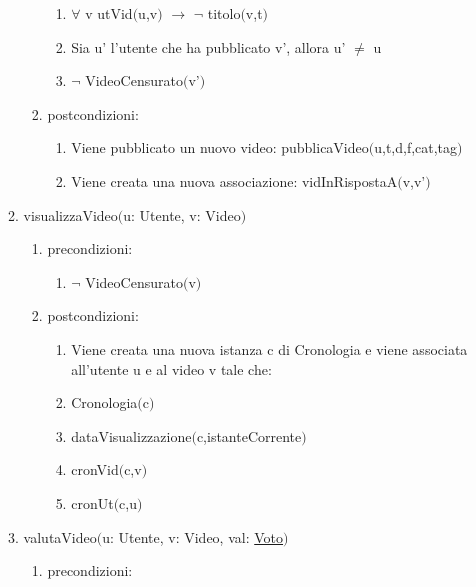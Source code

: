 \documentclass{article}
\begin{document}
\begin{enumerate}
\begin{enumerate}
\begin{enumerate}
            \begin{enumerate}
                \item $\forall$ v utVid$($u,v$)$ $\rightarrow$ $\neg$ titolo$($v,t$)$
                \item Sia u' l'utente che ha pubblicato v', allora u' $\neq$ u
                \item $\neg$ VideoCensurato$($v'$)$
            \end{enumerate}
            \item postcondizioni:
            \begin{enumerate}
                \item Viene pubblicato un nuovo video: pubblicaVideo$($u,t,d,f,cat,tag$)$
                \item Viene creata una nuova associazione: vidInRispostaA$($v,v'$)$
            \end{enumerate}
        \end{enumerate}
        \newpage
        \item visualizzaVideo$($u: Utente, v: Video$)$
        \begin{enumerate}
            \item precondizioni:
            \begin{enumerate}
                \item $\neg$ VideoCensurato$($v$)$
            \end{enumerate}
            \item postcondizioni:
            \begin{enumerate}
                \item Viene creata una nuova istanza c di Cronologia e viene associata all'utente u e al video v tale che:
                \item Cronologia$($c$)$
                \item dataVisualizzazione$($c,istanteCorrente$)$
                \item cronVid$($c,v$)$
                \item cronUt$($c,u$)$
            \end{enumerate}
        \end{enumerate}
        \newpage
        \item valutaVideo$($u: Utente, v: Video, val: \hyperref[sec:TipoVoto]{Voto}$)$
        \begin{enumerate}
            \item precondizioni:
            \begin{enumerate}

\end{enumerate}
\end{enumerate}
\end{enumerate}
\end{enumerate}
\end{document}
